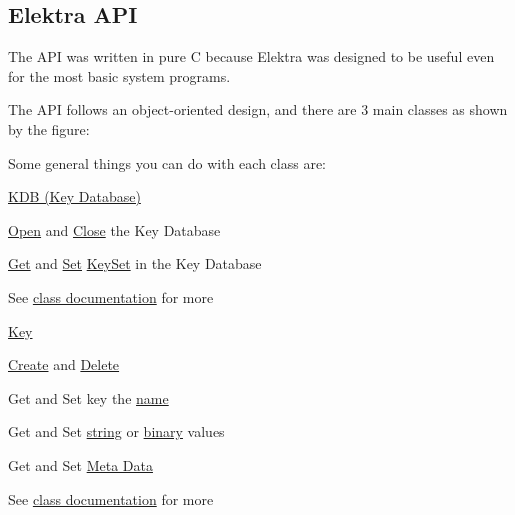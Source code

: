 \subsection*{Elektra A\+PI}

The A\+PI was written in pure C because Elektra was designed to be useful even for the most basic system programs.

The A\+PI follows an object-\/oriented design, and there are 3 main classes as shown by the figure\+:

 Some general things you can do with each class are\+:

\hyperlink{group__kdb}{K\+DB (Key Database)}


\begin{DoxyItemize}
\item \hyperlink{group__kdb_ga6808defe5870f328dd17910aacbdc6ca}{Open} and \hyperlink{group__kdb_gadb54dc9fda17ee07deb9444df745c96f}{Close} the Key Database
\item \hyperlink{group__kdb_ga28e385fd9cb7ccfe0b2f1ed2f62453a1}{Get} and \hyperlink{group__kdb_ga11436b058408f83d303ca5e996832bcf}{Set} \hyperlink{group__keyset}{Key\+Set} in the Key Database
\item See \hyperlink{group__kdb}{class documentation} for more
\end{DoxyItemize}

\hyperlink{group__key}{Key}
\begin{DoxyItemize}
\item \hyperlink{group__key_gad23c65b44bf48d773759e1f9a4d43b89}{Create} and \hyperlink{group__key_ga3df95bbc2494e3e6703ece5639be5bb1}{Delete}
\item Get and Set key the \hyperlink{group__keyname_ga7699091610e7f3f43d2949514a4b35d9}{name}
\item Get and Set \hyperlink{group__keyvalue_ga622bde1eb0e0c4994728331326340ef2}{string} or \hyperlink{group__keyvalue_gaa50a5358fd328d373a45f395fa1b99e7}{binary} values
\item Get and Set \hyperlink{group__keymeta}{Meta Data}
\item See \hyperlink{group__key}{class documentation} for more
\end{DoxyItemize}

